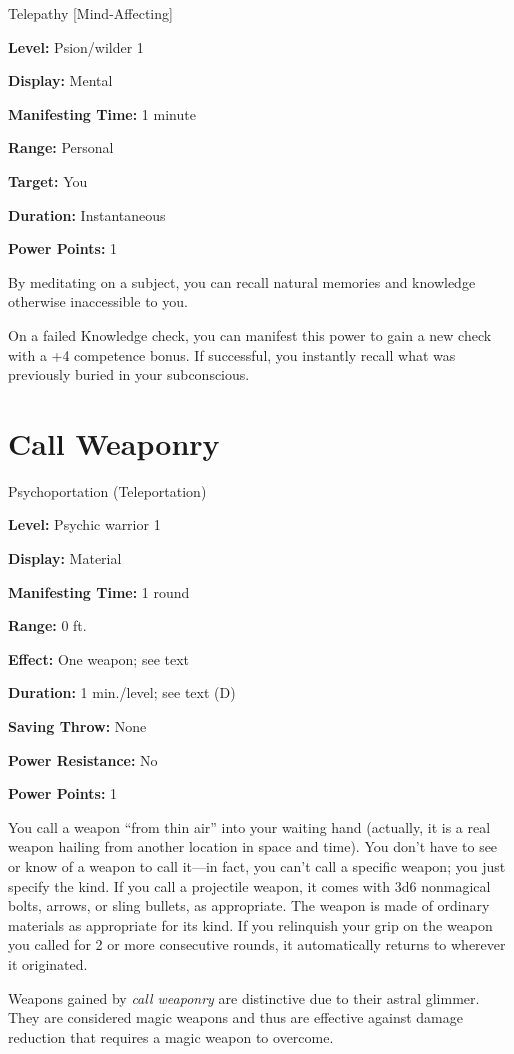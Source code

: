 \documentclass{article}
\begin{document}
Telepathy [Mind-Affecting]

\textbf{Level:} Psion/wilder 1

\textbf{Display:} Mental

\textbf{Manifesting Time:} 1 minute

\textbf{Range:} Personal

\textbf{Target:} You

\textbf{Duration:} Instantaneous

\textbf{Power Points:} 1

By meditating on a subject, you can recall natural memories and knowledge otherwise 
inaccessible to you.

On a failed Knowledge check, you can manifest this power to gain a new check with 
a +4 competence bonus. If successful, you instantly recall what was previously 
buried in your subconscious.

\vspace{12pt}
\section*{Call Weaponry}

Psychoportation (Teleportation)

\textbf{Level:} Psychic warrior 1

\textbf{Display:} Material

\textbf{Manifesting Time:} 1 round

\textbf{Range:} 0 ft.

\textbf{Effect:} One weapon; see text

\textbf{Duration:} 1 min./level; see text (D)

\textbf{Saving Throw:} None

\textbf{Power Resistance:} No

\textbf{Power Points:} 1

You call a weapon ``from thin air'' into your waiting hand (actually, it is a real 
weapon hailing from another location in space and time). You don't have to see 
or know of a weapon to call it---in fact, you can't call a specific weapon; you 
just specify the kind. If you call a projectile weapon, it comes with 3d6 nonmagical 
bolts, arrows, or sling bullets, as appropriate. The weapon is made of ordinary 
materials as appropriate for its kind. If you relinquish your grip on the weapon 
you called for 2 or more consecutive rounds, it automatically returns to wherever 
it originated.

Weapons gained by \textit{call weaponry }are distinctive due to their astral glimmer. 
They are considered magic weapons and thus are effective against damage reduction 
that requires a magic weapon to overcome.
\end{document}
